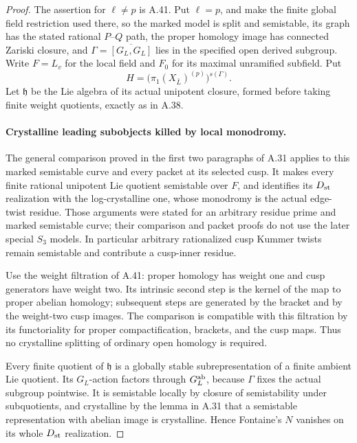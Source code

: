 \begin{proof}
The assertion for \(\ell\ne p\) is A.41. Put
\(\ell=p\), and make the finite global field restriction
used there, so the marked model is split and semistable,
its graph has the stated rational \(P\)--\(Q\) path,
the proper homology image has connected Zariski closure,
and \(\Gamma=\overline{[G_L,G_L]}\) lies in the
specified open derived subgroup. Write \(F=L_v\) for
the local field and \(F_0\) for its maximal unramified
subfield. Put
\[
 H=\bigl(\pi_1(X_{\bar L})^{(p)}\bigr)^{s(\Gamma)}.
\]
Let \(\mathfrak h\) be the Lie algebra of its actual
unipotent closure, formed before taking finite weight
quotients, exactly as in A.38.

\paragraph{Crystalline leading subobjects killed by local monodromy.}
The general comparison proved in the first two paragraphs
of A.31 applies to this marked semistable curve and every
packet at its selected cusp. It makes every finite rational
unipotent Lie quotient semistable over \(F\), and identifies
its \(D_{\rm st}\) realization with the log-crystalline
one, whose monodromy is the actual edge-twist residue.
Those arguments were stated for an arbitrary residue prime
and marked semistable curve; their comparison and packet
proofs do not use the later special \(S_3\) models.
In particular arbitrary rationalized cusp Kummer twists
remain semistable and contribute a cusp-inner residue.

Use the weight filtration of A.41: proper homology has
weight one and cusp generators have weight two. Its
intrinsic second step is the kernel of the map to proper
abelian homology; subsequent steps are generated by the
bracket and by the weight-two cusp images. The comparison
is compatible with this filtration by its functoriality
for proper compactification, brackets, and the cusp maps.
Thus no crystalline splitting of ordinary open homology
is required.

Every finite quotient of \(\mathfrak h\) is a globally
stable subrepresentation of a finite ambient Lie quotient.
Its \(G_L\)-action factors through \(G_L^{\rm ab}\),
because \(\Gamma\) fixes the actual subgroup pointwise.
It is semistable locally by closure of semistability under
subquotients, and crystalline by the lemma in A.31 that a semistable
representation with abelian image is crystalline. Hence
Fontaine's \(N\) vanishes on its whole \(D_{\rm st}\)
realization.


\end{proof}
